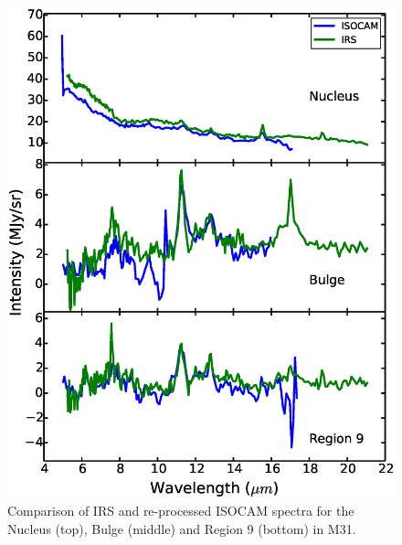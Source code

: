\begin{figure}
\centering
\includegraphics[scale=0.35]{./fig6.eps}
\caption{ Comparison of  IRS and re-processed ISOCAM spectra for the Nucleus (top), Bulge (middle) and Region 9 (bottom) in M31.}
\label{ISOnIRS}
\end{figure}




